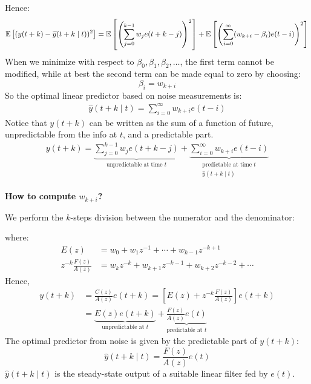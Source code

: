 Hence:
\begin{align*}
	\mathbb{E}\left[(y(t+k)-\widehat{y}(t+k \mid t))^{2}\right]=\mathbb{E}\left[\left(\sum_{j=0}^{k-1} w_{j} e(t+k-j)\right)^{2}\right]+\mathbb{E}\left[\left(\sum_{i=0}^{\infty} (w_{k+i}-\beta_{i}) e(t-i)\right)^{2}\right]
\end{align*}
When we minimize with respect to $\beta_{0}, \beta_{1}, \beta_{2}, \ldots$, the first term cannot be modified, while at best the second term can be made equal to zero by choosing:
\[
	\boxed{\beta_{i} = w_{k+i}}
\]
So the optimal linear predictor based on noise measurements is:
\begin{align*}
	\boxed{\hat{y}(t+k \mid t) = \sum_{i=0}^{\infty}w_{k+i} e(t-i)}
\end{align*}
Notice that $y(t+k)$ can be written as the sum of a function of future, unpredictable from the info at $t$, and a predictable part. 
\begin{align*}
	y(t+k)= \underbrace{\sum_{j=0}^{k-1} w_{j} e(t+k-j)}_{\text{unpredictable at time $t$}} + \underbrace{\sum_{i=0}^{\infty} w_{k+i} e(t-i)}_{\substack{\text{predictable at time $t$}\\\hat{y}(t+k \mid t)}}
\end{align*}

\textbf{How to compute $w_{k+i}$?}

We perform the $k$-steps division between the numerator and the denominator:
\begin{figure}[htpb]
	\centering
\end{figure}
\FloatBarrier
where:
\begin{align*}
	E(z)&=w_{0}+w_{1} z^{-1}+\cdots+w_{k-1} z^{-k+1} \\
	z^{-k} \frac{F(z)}{A(z)}&=w_{k} z^{-k}+w_{k+1} z^{-k-1}+w_{k+2} z^{-k-2}+\cdots
\end{align*}
Hence,
\begin{align*}
	y(t+k) &=\frac{C(z)}{A(z)} e(t+k)=\left[E(z)+z^{-k} \frac{F(z)}{A(z)}\right] e(t+k)\\
	&=\underbrace{E(z)e(t+k)}_{\text{unpredictable at }t}+\underbrace{\frac{F(z)}{A(z)}e(t)}_{\text{predictable at }t}
\end{align*}
The optimal predictor from noise is given by the predictable part of $y(t + k)$:
\[
	\boxed{\hat{y}(t+k \mid t) = \frac{F(z)}{A(z)}e(t)}
\]
$\hat{y}(t+k \mid t)$ is the steady-state output of a suitable linear filter fed by $e(t)$.

